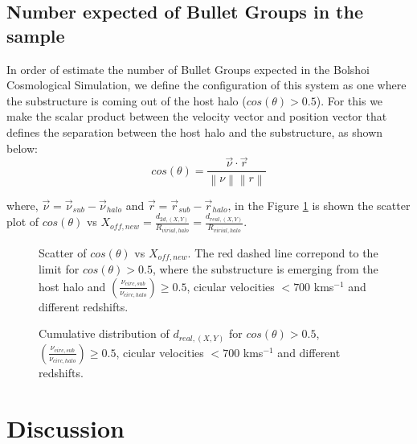 \documentclass{emulateapj}
\begin{document}
\subsection{Number expected of Bullet Groups in the sample}


In order of estimate the number of Bullet Groups expected in the Bolshoi Cosmological Simulation, we 
define the configuration of this system as one where the substructure is coming out of the host halo ($cos(\theta)>0.5$). For this 
we make the scalar product between the velocity vector and position vector that defines the separation between 
 the host halo and the substructure, as shown below: \\
 
 \begin{equation}
  cos(\theta)=\frac{\vec{\nu{}}\cdotp{}\vec{r}}{\left\|\nu{}\right\| \left\|r\right\|}
 \end{equation}

where, $\vec{\nu{}}=\vec{\nu}_{sub}-\vec{\nu}_{halo}$ and $\vec{r}=\vec{r}_{sub}-\vec{r}_{halo}$, in the Figure \ref{cos_theta}
is shown the scatter plot of $cos(\theta{})$ vs $X_{off,new}=\frac{d_{2d,(X,Y)}}{R_{virial,halo}}=\frac{d_{real,(X,Y)}}{R_{virial,halo}}$.  


\begin{figure}
\begin{center}
\end{center}
\caption{Scatter of $cos(\theta)$ vs $X_{off,new}$. The red dashed line correpond to the limit for $cos(\theta{})>0.5$,  
where the substructure is emerging from the host halo and  $\left(\frac{\nu_{circ,sub}}{\nu_{circ,halo}}\right)\geq0.5$, 
cicular velocities $<700$ kms$^{-1}$ and different redshifts.} 
\label{cos_theta}
\end{figure}

\begin{figure}
\begin{center}
\end{center}
\caption{Cumulative distribution of $d_{real, (X,Y)}$ for $cos(\theta)>0.5$, $\left(\frac{\nu_{circ,sub}}{\nu_{circ,halo}}\right)\geq0.5$, 
cicular velocities $<700$ kms$^{-1}$ and different redshifts.} 
\label{cumulative_cos}
\end{figure}


\section{Discussion}
\label{sec:discussion}
\end{document}
